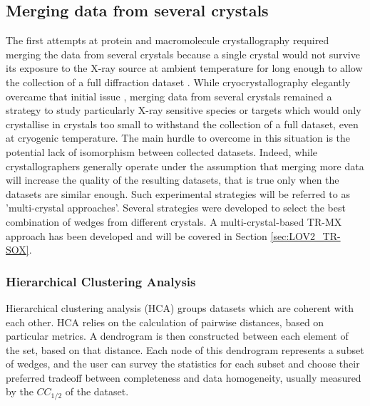 \subsection{Merging data from several crystals}

The first attempts at protein and macromolecule crystallography required merging the data from several crystals because a single crystal would not survive its exposure to the X-ray source at ambient temperature for long enough to allow the collection of a full diffraction dataset \parencite{kendrewThreeDimensionalModelMyoglobin1958, perutzStructureHaemoglobinThreeDimensional1960, blakeStructureHenEggWhite1965}. While cryocrystallography elegantly overcame that initial issue \parencite{hopeCryocrystallographyRibosomalParticles1989}, merging data from several crystals remained a strategy to study particularly X-ray sensitive species \parencite{fedorovCrystalStructuresMolecular2003} or targets which would only crystallise in crystals too small to withstand the collection of a full dataset, even at cryogenic temperature. The main hurdle to overcome in this situation is the potential lack of isomorphism between collected datasets. Indeed, while crystallographers generally operate under the assumption that merging more data will increase the quality of the resulting datasets, that is true only when the datasets are similar enough. Such experimental strategies will be referred to as 'multi-crystal approaches'. Several strategies were developed to select the best combination of wedges from different crystals. A multi-crystal-based TR-MX approach has been developed and will be covered in Section \ref{sec:LOV2_TR-SOX}.

\subsubsection{Hierarchical Clustering Analysis} 

Hierarchical clustering analysis (HCA) groups datasets which are coherent with each other. HCA relies on the calculation of pairwise distances, based on particular metrics. A dendrogram is then constructed between each element of the set, based on that distance. Each node of this dendrogram represents a subset of wedges, and the user can survey the statistics for each subset and choose their preferred tradeoff between completeness and data homogeneity, usually measured by the \(CC_{1/2}\) \parencite{karplusLinkingCrystallographicModel2012} of the dataset. 


